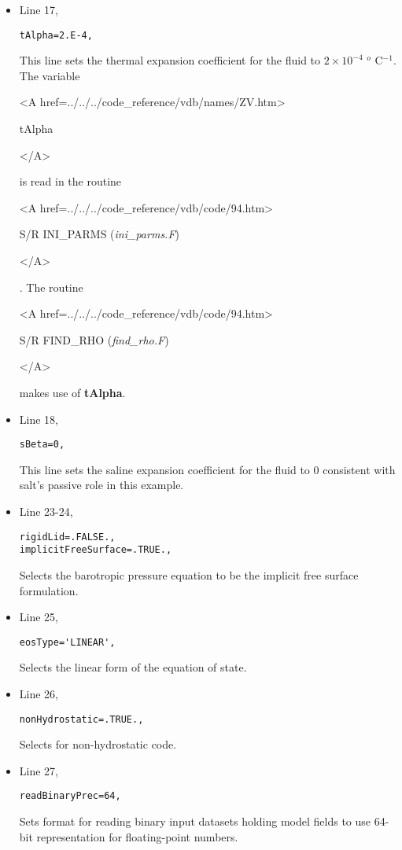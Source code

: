 \begin{itemize}
\item Line 17,
\begin{verbatim}
tAlpha=2.E-4,
\end{verbatim}
This line sets the thermal expansion coefficient for the fluid
to $2 \times 10^{-4}$ $^o$ C$^{-1}$.
The variable
{\bf
\begin{rawhtml} <A href=../../../code_reference/vdb/names/ZV.htm> \end{rawhtml}
tAlpha 
\begin{rawhtml} </A>\end{rawhtml}
}
is read in the routine
{\it
\begin{rawhtml} <A href=../../../code_reference/vdb/code/94.htm> \end{rawhtml}
S/R INI\_PARMS ({\it ini\_parms.F})
\begin{rawhtml} </A>\end{rawhtml}
}. 
The routine 
{\it
\begin{rawhtml} <A href=../../../code_reference/vdb/code/94.htm> \end{rawhtml}
S/R FIND\_RHO ({\it find\_rho.F})
\begin{rawhtml} </A>\end{rawhtml}
} makes use of {\bf tAlpha}.

\item Line 18,
\begin{verbatim}
sBeta=0,
\end{verbatim}
This line sets the saline expansion coefficient for the fluid
to $0$ consistent with salt's passive role in this example.


\item Line 23-24,
\begin{verbatim}
rigidLid=.FALSE., 
implicitFreeSurface=.TRUE., 
\end{verbatim}
Selects the barotropic pressure equation to be the implicit free surface
formulation.

\item Line 25,
\begin{verbatim}
eosType='LINEAR',
\end{verbatim}
Selects the linear form of the equation of state.


\item Line 26,
\begin{verbatim}
nonHydrostatic=.TRUE.,
\end{verbatim}
Selects for non-hydrostatic code.


\item Line 27,
\begin{verbatim}
readBinaryPrec=64,
\end{verbatim}
Sets format for reading binary input datasets holding model fields to
use 64-bit representation for floating-point numbers.


\end{itemize}
